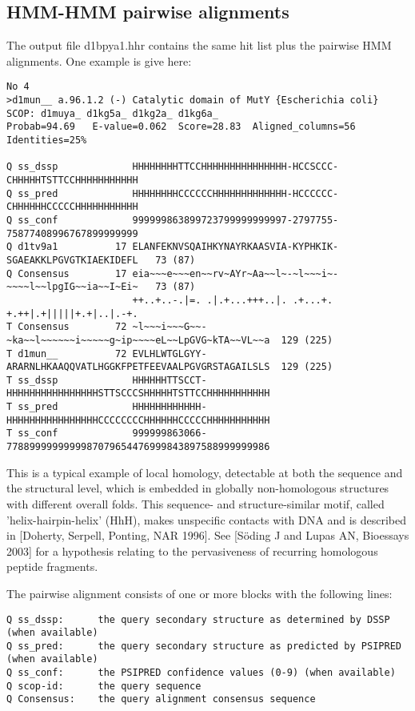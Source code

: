 \documentclass[11pt,a4paper]{article}
\begin{document}
\subsection{HMM-HMM pairwise alignments}

The output file d1bpya1.hhr contains the same hit list plus the pairwise HMM alignments. One example is give here:

\scriptsize\begin{verbatim}
No 4  
>d1mun__ a.96.1.2 (-) Catalytic domain of MutY {Escherichia coli} SCOP: d1muya_ d1kg5a_ d1kg2a_ d1kg6a_ 
Probab=94.69   E-value=0.062  Score=28.83  Aligned_columns=56  Identities=25%

Q ss_dssp             HHHHHHHHTTCCHHHHHHHHHHHHHHH-HCCSCCC-CHHHHHTSTTCCHHHHHHHHHHH
Q ss_pred             HHHHHHHHCCCCCCHHHHHHHHHHHHH-HCCCCCC-CHHHHHHCCCCCHHHHHHHHHHH
Q ss_conf             999999863899723799999999997-2797755-75877408996767899999999
Q d1tv9a1          17 ELANFEKNVSQAIHKYNAYRKAASVIA-KYPHKIK-SGAEAKKLPGVGTKIAEKIDEFL   73 (87)
Q Consensus        17 eia~~~e~~~en~~rv~AYr~Aa~~l~-~l~~~i~-~~~~l~~lpgIG~~ia~~I~Ei~   73 (87)
                      ++..+..-.|=. .|.+...+++..|. .+...+. +.++|.+|||||+.+|..|.-+.
T Consensus        72 ~l~~~i~~~G~~-~ka~~l~~~~~~i~~~~~g~ip~~~~eL~~LpGVG~kTA~~VL~~a  129 (225)
T d1mun__          72 EVLHLWTGLGYY-ARARNLHKAAQQVATLHGGKFPETFEEVAALPGVGRSTAGAILSLS  129 (225)
T ss_dssp             HHHHHHTTSCCT-HHHHHHHHHHHHHHHHSTTSCCCSHHHHHTSTTCCHHHHHHHHHHH
T ss_pred             HHHHHHHHHHHH-HHHHHHHHHHHHHHHHCCCCCCCCHHHHHHCCCCCHHHHHHHHHHH
T ss_conf             999999863066-7788999999999987079654476999843897588999999986
\end{verbatim}\normalsize

This is a typical example of local homology, detectable at both the sequence and the
structural level, which is embedded in globally non-homologous structures with 
different overall folds. This sequence- and structure-similar motif, called 
'helix-hairpin-helix' (HhH), makes unspecific contacts with DNA and is described 
in [Doherty, Serpell, Ponting, NAR 1996]. See [S\"oding J and Lupas AN, Bioessays 
2003] for a hypothesis relating to the pervasiveness of recurring homologous
peptide fragments.

The pairwise alignment consists of one or more blocks with the following lines:

\small\begin{verbatim}
Q ss_dssp:      the query secondary structure as determined by DSSP (when available)
Q ss_pred:      the query secondary structure as predicted by PSIPRED (when available)
Q ss_conf:      the PSIPRED confidence values (0-9) (when available)
Q scop-id:      the query sequence
Q Consensus:    the query alignment consensus sequence
\end{verbatim}\normalsize
\end{document}
